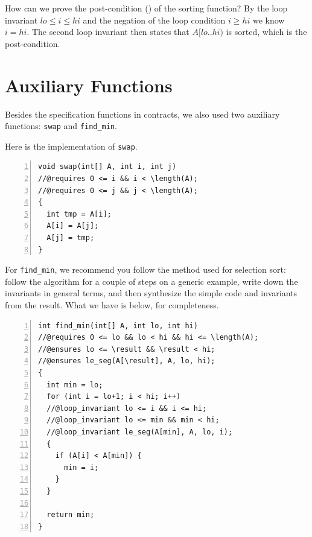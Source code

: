 
How can we prove the post-condition (\ensures{}) of the sorting
function?  By the loop invariant $\mathit{lo} \leq i \leq \mathit{hi}$
and the negation of the loop condition $i \geq \mathit{hi}$ we know $i
= \mathit{hi}$.  The second loop invariant then states that
$A\lbrack \mathit{lo}{..}\mathit{hi})$ is sorted, which is the
post-condition.

\clearpage
\section{Auxiliary Functions}
\label{sec:bigo:auxiliary}

Besides the specification functions in contracts, we also
used two auxiliary functions: \lstinline'swap' and \lstinline'find_min'.

Here is the implementation of \lstinline'swap'.
%
\begin{lstlisting}[language={[C0]C}, numbers=left]
void swap(int[] A, int i, int j)
//@requires 0 <= i && i < \length(A);
//@requires 0 <= j && j < \length(A);
{
  int tmp = A[i];
  A[i] = A[j];
  A[j] = tmp;
}
\end{lstlisting}


For \lstinline'find_min', we recommend you follow the method used for
selection sort: follow the algorithm for a couple of steps on a
generic example, write down the invariants in general terms, and then
synthesize the simple code and invariants from the result.  What we
have is below, for completeness.

%
\begin{lstlisting}[language={[C0]C}, numbers=left]
int find_min(int[] A, int lo, int hi)
//@requires 0 <= lo && lo < hi && hi <= \length(A);
//@ensures lo <= \result && \result < hi;
//@ensures le_seg(A[\result], A, lo, hi);
{
  int min = lo;
  for (int i = lo+1; i < hi; i++)
  //@loop_invariant lo <= i && i <= hi;
  //@loop_invariant lo <= min && min < hi;
  //@loop_invariant le_seg(A[min], A, lo, i);
  {
    if (A[i] < A[min]) {
      min = i;
    }
  }

  return min;
}
\end{lstlisting}


